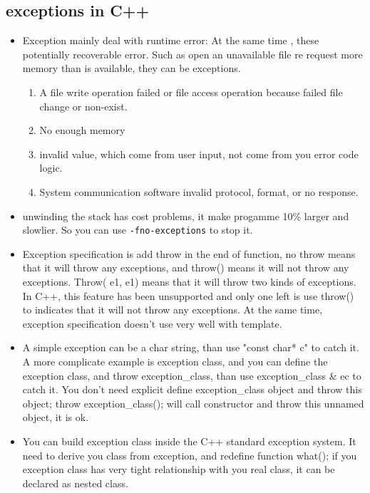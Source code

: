 \documentclass[a4paper,11pt,twoside]{book}
\begin{document}
\subsection{exceptions in C++}
\begin{itemize}
	\item Exception mainly deal with runtime error: At the same time , these potentially recoverable error.  Such as open an unavailable file re request more memory than is available, they can be exceptions.
	
	\begin{enumerate}
		\item A file write operation failed or file access operation because failed file change or non-exist.
		
		\item No enough memory
		
		\item invalid value, which come from user input, not come from you error code logic.
		
		\item System communication software invalid protocol, format, or no response.
	\end{enumerate}
	
	\item unwinding the stack has cost problems, it make progamme 10\% larger and slowlier. So you can use \texttt{-fno-exceptions} to stop it.
	
	\item Exception specification is add throw in the end of function, no throw means that it will throw any exceptions, and throw() means it will not throw any exceptions. Throw( e1, e1) means that it will throw two kinds of exceptions. In C++, this feature has been unsupported and only one left is use throw() to indicates that it will not throw any exceptions.  At the same time, exception specification doesn't use very well with template.
	
	\item A simple exception can be a char string, than use "const char* c" to catch it. A more complicate example is exception class, and you can define the exception class, and throw exception\_class, than use exception\_class \& ec to catch it.  You don't need explicit define exception\_class object and throw this object; throw exception\_class(); will call constructor and throw this unnamed object, it is ok.
	
	\item You can build exception class inside the C++ standard exception system. It need to derive you class from exception, and redefine function what();  if you exception class has very tight relationship with you real class, it can be declared as nested class.
	

\end{itemize}
\end{document}

